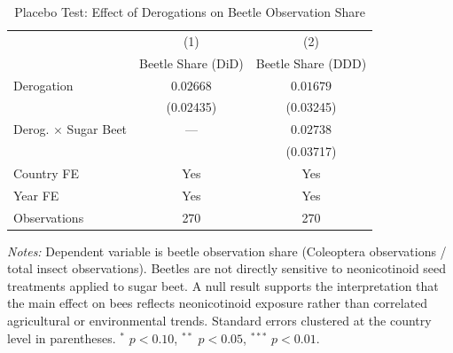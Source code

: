 \begin{table}[htbp]
\centering
\caption{Placebo Test: Effect of Derogations on Beetle Observation Share}
\label{tab:placebo}
\begin{threeparttable}
\begin{tabular}{lcc}
\toprule
 & (1) & (2) \\
 & Beetle Share (DiD) & Beetle Share (DDD) \\
\midrule
Derogation & $0.02668$ & $0.01679$ \\
 & (0.02435) & (0.03245) \\
Derog. $\times$ Sugar Beet & --- & $0.02738$ \\
 & & (0.03717) \\
\midrule
Country FE & Yes & Yes \\
Year FE & Yes & Yes \\
Observations & 270 & 270 \\
\bottomrule
\end{tabular}
\begin{tablenotes}[flushleft]
\small
\item \textit{Notes:} Dependent variable is beetle observation share (Coleoptera observations / total insect observations). Beetles are not directly sensitive to neonicotinoid seed treatments applied to sugar beet. A null result supports the interpretation that the main effect on bees reflects neonicotinoid exposure rather than correlated agricultural or environmental trends. Standard errors clustered at the country level in parentheses. $^{*}$ $p<0.10$, $^{**}$ $p<0.05$, $^{***}$ $p<0.01$.
\end{tablenotes}
\end{threeparttable}
\end{table}

